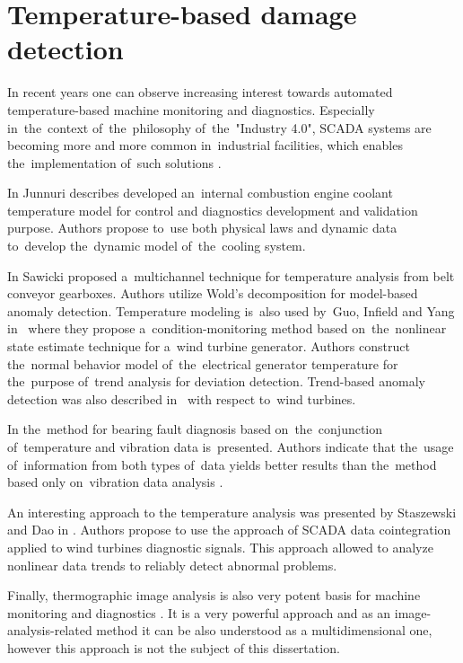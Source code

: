 \section{Temperature-based damage detection}

In recent years one can observe increasing interest towards automated temperature-based machine monitoring and diagnostics. Especially in~the~context of~the~philosophy of~the~"Industry 4.0", SCADA systems are becoming more and more common in~industrial facilities, which enables the~implementation of~such solutions \cite{zhang2012research,eliasson2013internet,bongers2008fault,wilkinson2014comparison}.

In \cite{junnuri2015engine} Junnuri describes developed an~internal combustion engine coolant temperature model for control and diagnostics development and validation purpose. Authors propose to~use both physical laws and dynamic data to~develop the~dynamic model of~the~cooling system.

In \cite{sawicki2015automatic} Sawicki proposed a~multichannel technique for temperature analysis from belt conveyor gearboxes. Authors utilize Wold's decomposition for model-based anomaly detection. Temperature modeling is~also used by~Guo, Infield and Yang in~\cite{guo2011wind} 
where they propose a~condition-monitoring method based on~the~nonlinear state estimate technique for a~wind turbine generator. Authors construct the~normal behavior model of~the~electrical
generator temperature for the~purpose of~trend analysis for deviation detection. Trend-based anomaly detection was also described in~\cite{astolfi2014fault} with respect to~wind turbines.

In \cite{Nembhard2013} the~method for bearing fault diagnosis based on~the~conjunction of~temperature and vibration data is~presented. Authors indicate that the~usage of~information from both types of~data yields better results than the~method based only on~vibration data analysis \cite{Nembhard2013b}.

An interesting approach to the temperature analysis was presented by Staszewski and Dao in \cite{DAO2018107}. Authors propose to use the approach of SCADA data cointegration applied to wind turbines diagnostic signals. This approach allowed to analyze nonlinear data trends to reliably detect abnormal problems.

Finally, thermographic image analysis is also very potent basis for machine monitoring and diagnostics \cite{Lim2014,5608306}. It is a very powerful approach and as an image-analysis-related method it can be also understood as a multidimensional one, however this approach is not the subject of this dissertation.

